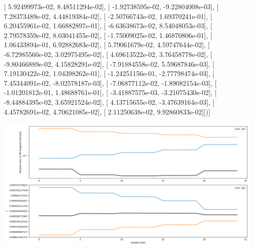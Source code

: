 \documentclass{article}
\begin{document}
       [  5.92499973e-02,   8.48511294e-02],
       [ -1.92738595e-02,  -9.22804008e-03],
       [  7.28373489e-02,   4.44819384e-02],
       [ -2.50766743e-02,   1.69370241e-01],
       [  6.20455961e-02,   1.66882897e-01],
       [ -6.63638673e-02,   8.54048053e-03],
       [  2.79578359e-02,   8.03041455e-02],
       [ -1.75009025e-02,   1.46870806e-01],
       [  1.06433894e-01,   6.92882683e-02],
       [  5.79061679e-02,   4.59747644e-02],
       [ -6.72985560e-02,   3.02975495e-02],
       [  4.69613522e-02,   3.76458778e-02],
       [ -9.80466889e-02,   4.15828291e-02],
       [ -7.91884558e-02,   5.59687846e-03],
       [  7.19130422e-02,   1.04398262e-01],
       [ -1.24251156e-01,  -2.77798474e-03],
       [  7.45344091e-02,  -8.02578187e-03],
       [ -7.06877112e-02,  -1.89082154e-03],
       [ -1.01201812e-01,   1.48688761e-01],
       [ -3.41887575e-03,  -3.21075430e-02],
       [ -8.44884395e-02,   3.65921524e-02],
       [  4.13715655e-02,  -3.47639164e-03],
       [  4.45782691e-02,   4.70621085e-02],
       [  2.11250638e-02,   9.92860833e-02]])]
\begin{center}
\includegraphics[scale=.9]{report_pickled_controls211/control_dpn_all.png}

\end{center}
\end{document}
